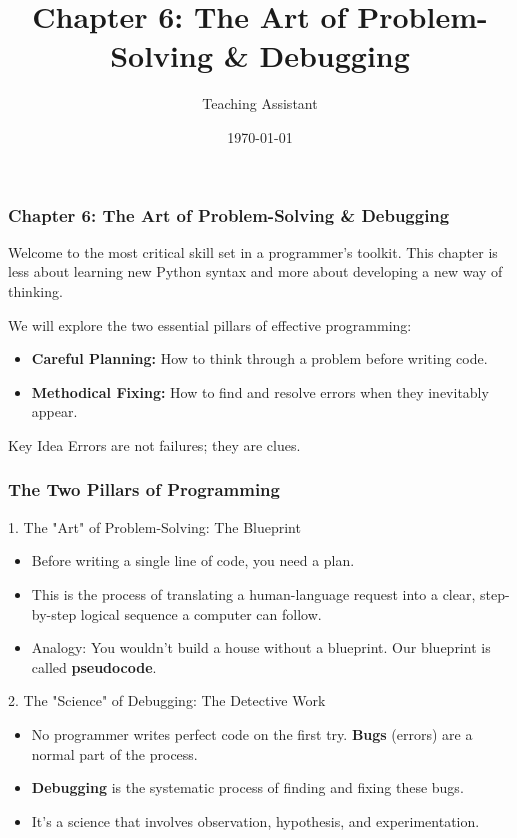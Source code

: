 \documentclass{beamer}
\title{Chapter 6: The Art of Problem-Solving \& Debugging}
\author{Teaching Assistant}
\institute{University Department}
\date{\today}
\begin{document}
\frame{\titlepage}

\begin{frame}[fragile]
    \frametitle{Chapter 6: The Art of Problem-Solving \& Debugging}
    
    Welcome to the most critical skill set in a programmer's toolkit. This chapter is less about learning new Python syntax and more about developing a new way of thinking.
    \vspace{1em}
    
    We will explore the two essential pillars of effective programming:
    \begin{itemize}
        \item \textbf{Careful Planning:} How to think through a problem before writing code.
        \item \textbf{Methodical Fixing:} How to find and resolve errors when they inevitably appear.
    \end{itemize}
    \vspace{\fill}
    
    \begin{block}{Key Idea}
        Errors are not failures; they are clues.
    \end{block}
\end{frame}

\begin{frame}[fragile]
    \frametitle{The Two Pillars of Programming}
    
    \begin{block}{1. The "Art" of Problem-Solving: The Blueprint}
        \begin{itemize}
            \item Before writing a single line of code, you need a plan.
            \item This is the process of translating a human-language request into a clear, step-by-step logical sequence a computer can follow.
            \item Analogy: You wouldn't build a house without a blueprint. Our blueprint is called \textbf{pseudocode}.
        \end{itemize}
    \end{block}
    
    \vspace{1em}
    
    \begin{block}{2. The "Science" of Debugging: The Detective Work}
        \begin{itemize}
            \item No programmer writes perfect code on the first try. \textbf{Bugs} (errors) are a normal part of the process.
            \item \textbf{Debugging} is the systematic process of finding and fixing these bugs.
            \item It’s a science that involves observation, hypothesis, and experimentation.
        \end{itemize}
    \end{block}
\end{frame}
\end{document}
